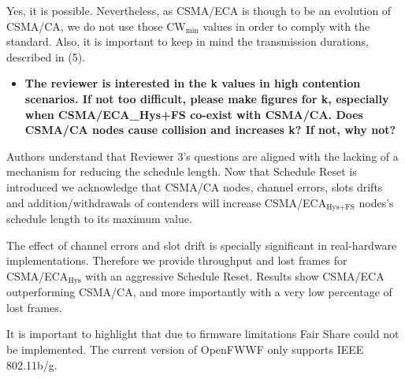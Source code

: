 \documentclass[]{article}
\begin{document}
		Yes, it is possible. Nevertheless, as CSMA/ECA is though to be an evolution of CSMA/CA, we do not use those CW$_{\min}$ values in order to comply with the standard. Also, it is important to keep in mind the transmission durations, described in (5).
		
		\begin{itemize}
			\item {\bfseries The reviewer is interested in the k values in high contention scenarios. If not too difficult, please make figures for k, especially when CSMA/ECA\_{Hys+FS} co-exist with CSMA/CA. Does CSMA/CA nodes cause collision and increases k? If not, why not?}
		\end{itemize}
		
		Authors understand that Reviewer 3's questions are aligned with the lacking of a mechanism for reducing the schedule length. Now that Schedule Reset is introduced we acknowledge that CSMA/CA nodes, channel errors, slots drifts and addition/withdrawals of contenders will increase CSMA/ECA$_{\text{Hys+FS}}$ nodes's schedule length to its maximum value.
		
		The effect of channel errors and slot drift is specially significant in real-hardware implementations. Therefore we provide throughput and lost frames for CSMA/ECA$_{\text{Hys}}$ with an aggressive Schedule Reset. Results show CSMA/ECA outperforming CSMA/CA, and more importantly with a very low percentage of lost frames.
		
		It is important to highlight that due to firmware limitations Fair Share could not be implemented. The current version of OpenFWWF only supports IEEE 802.11b/g.
		
%
%
\end{document}
